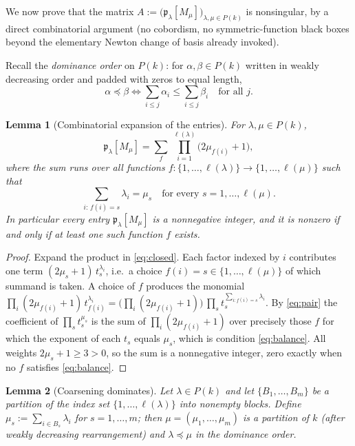 \documentclass[12pt]{article}
\newtheorem{lemma}{Lemma}
\theoremstyle{definition}
\begin{document}
We now prove that the matrix
$A:=\big(\mathfrak{p}_\lambda[M_\mu]\big)_{\lambda,\mu\in P(k)}$ is nonsingular, by a
direct combinatorial argument (no cobordism, no symmetric-function black boxes beyond the
elementary Newton change of basis already invoked).

Recall the \emph{dominance order} on $P(k)$: for $\alpha,\beta\in P(k)$ written in
weakly decreasing order and padded with zeros to equal length,
\[
\alpha\preceq\beta\iff
\sum_{i\le j}\alpha_i\le\sum_{i\le j}\beta_i\quad\text{for all }j.
\]

\begin{lemma}[Combinatorial expansion of the entries]\label{lem:expand}
For $\lambda,\mu\in P(k)$,
\[
\mathfrak{p}_\lambda[M_\mu]
=\sum_{f}\ \prod_{i=1}^{\ell(\lambda)}\big(2\mu_{f(i)}+1\big),
\tag{8}\label{eq:expand}
\]
where the sum runs over all functions $f:\{1,\dots,\ell(\lambda)\}\to\{1,\dots,\ell(\mu)\}$
such that
\[
\sum_{i:\,f(i)=s}\lambda_i=\mu_s\quad\text{for every }s=1,\dots,\ell(\mu).
\tag{9}\label{eq:balance}
\]
In particular every entry $\mathfrak{p}_\lambda[M_\mu]$ is a nonnegative integer, and it
is nonzero if and only if at least one such function $f$ exists.
\end{lemma}

\begin{proof}
Expand the product in \eqref{eq:closed}.  Each factor indexed by $i$ contributes one term
$(2\mu_{s}+1)\,t_{s}^{\lambda_i}$, i.e.\ a choice $f(i)=s\in\{1,\dots,\ell(\mu)\}$ of which
summand is taken.  A choice of $f$ produces the monomial
$\prod_{i}(2\mu_{f(i)}+1)\,t_{f(i)}^{\lambda_i}
=\big(\prod_i(2\mu_{f(i)}+1)\big)\,\prod_{s}t_s^{\sum_{i:f(i)=s}\lambda_i}$.
By \eqref{eq:pair} the coefficient of $\prod_s t_s^{\mu_s}$ is the sum of
$\prod_i(2\mu_{f(i)}+1)$ over precisely those $f$ for which the exponent of each $t_s$
equals $\mu_s$, which is condition \eqref{eq:balance}.  All weights
$2\mu_s+1\ge 3>0$, so the sum is a nonnegative integer, zero exactly when no $f$ satisfies
\eqref{eq:balance}.
\end{proof}

\begin{lemma}[Coarsening dominates]\label{lem:merge}
Let $\lambda\in P(k)$ and let $\{B_1,\dots,B_m\}$ be a partition of the index set
$\{1,\dots,\ell(\lambda)\}$ into nonempty blocks.  Define $\mu_s:=\sum_{i\in B_s}\lambda_i$
for $s=1,\dots,m$; then $\mu=(\mu_1,\dots,\mu_m)$ is a partition of $k$ (after weakly
decreasing rearrangement) and $\lambda\preceq\mu$ in the dominance order.
\end{lemma}
\end{document}

